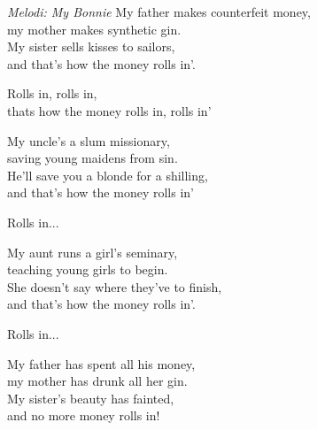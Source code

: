 {\footnotesize\textit{Melodi: My Bonnie}}
My father makes counterfeit money,\\
my mother makes synthetic gin.\\
My sister sells kisses to sailors,\\
and that's how the money rolls in'.\par
\vspace{10pt}
\revrpt Rolls in, rolls in,\\
thats how the money rolls in, rolls in' \rpt\par
\vspace{10pt}
My uncle's a slum missionary,\\
saving young maidens from sin.\\
He'll save you a blonde for a shilling,\\
and that's how the money rolls in'\par
\vspace{10pt}
Rolls in...\par
\vspace{10pt}
My aunt runs a girl's seminary,\\
teaching young girls to begin.\\
She doesn't say where they've to finish,\\
and that's how the money rolls in'.\par
\vspace{10pt}
Rolls in...\par
\vspace{10pt}
My father has spent all his money,\\
my mother has drunk all her gin.\\
My sister’s beauty has fainted,\\
and no more money rolls in!
\par
\vspace{10pt}
